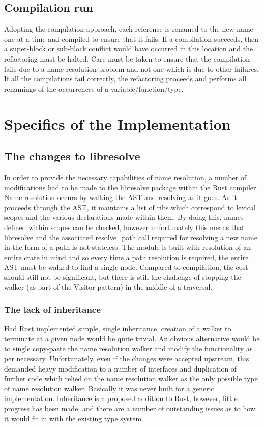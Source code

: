 \subsection{Compilation run}
Adopting the compilation approach, each reference is renamed to the new name one at a time and compiled to ensure that it fails. If a compilation succeeds, then a super-block or sub-block conflict would have occurred in this location and the refactoring must be halted. Care must be taken to ensure that the compilation fails due to a name resolution problem and not one which is due to other failures. If all the compilations fail correctly, the refactoring proceeds and performs all renamings of the occurrences of a variable/function/type.

\section{Specifics of the Implementation}

\subsection{The changes to libresolve}
In order to provide the necessary capabilities of name resolution, a number of modifications had to be made to the libresolve package within the Rust compiler. Name resolution occurs by walking the AST and resolving as it goes. As it proceeds through the AST, it maintains a list of ribs which correspond to lexical scopes and the various declarations made within them. By doing this, names defined within scopes can be checked, however unfortunately this means that libresolve and the associated resolve\_path call required for resolving a new name in the form of a path is not stateless. The module is built with resolution of an entire crate in mind and so every time a path resolution is required, the entire AST must be walked to find a single node. Compared to compilation, the cost should still not be significant, but there is still the challenge of stopping the walker (as part of the Visitor pattern) in the middle of a traversal. 

\subsubsection{The lack of inheritance}
Had Rust implemented simple, single inheritance, creation of a walker to terminate at a given node would be quite trivial. An obvious alternative would be to single copy-paste the name resolution walker and modify the functionality as per necessary. Unfortunately, even if the changes were accepted upstream, this demanded heavy modification to a number of interfaces and duplication of further code which relied on the name resolution walker as the only possible type of name resolution walker. Basically it was never built for a generic implementation. Inheritance is a proposed addition to Rust, however, little progress has been made, and there are a number of outstanding issues as to how it would fit in with the existing type system.

